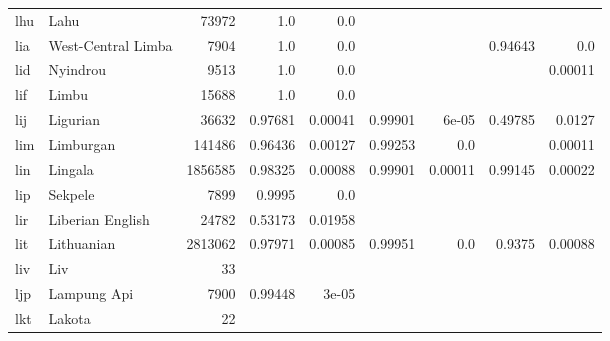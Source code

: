 \documentclass[11pt]{article}
\begin{document}
\begin{table*}[h]
{\begin{tabular}{llrrrrrrr}
lhu         & Lahu         & 73972         & 1.0         & 0.0         &          &          &          &          \\

lia         & West-Central Limba         & 7904         & 1.0         & 0.0         &          &          & 0.94643         & 0.0         \\

lid         & Nyindrou         & 9513         & 1.0         & 0.0         &          &          &          & 0.00011         \\

lif         & Limbu         & 15688         & 1.0         & 0.0         &          &          &          &          \\

lij         & Ligurian         & 36632         & 0.97681         & 0.00041         & 0.99901         & 6e-05         & 0.49785         & 0.0127         \\

lim         & Limburgan         & 141486         & 0.96436         & 0.00127         & 0.99253         & 0.0         &          & 0.00011         \\

lin         & Lingala         & 1856585         & 0.98325         & 0.00088         & 0.99901         & 0.00011         & 0.99145         & 0.00022         \\

lip         & Sekpele         & 7899         & 0.9995         & 0.0         &          &          &          &          \\

lir         & Liberian English         & 24782         & 0.53173         & 0.01958         &          &          &          &          \\

lit         & Lithuanian         & 2813062         & 0.97971         & 0.00085         & 0.99951         & 0.0         & 0.9375         & 0.00088         \\

liv         & Liv         & 33         &          &          &          &          &          &          \\

ljp         & Lampung Api         & 7900         & 0.99448         & 3e-05         &          &          &          &          \\

lkt         & Lakota         & 22         &          &          &          &          &          &          \\


\end{tabular}}
\end{table*}
\end{document}
